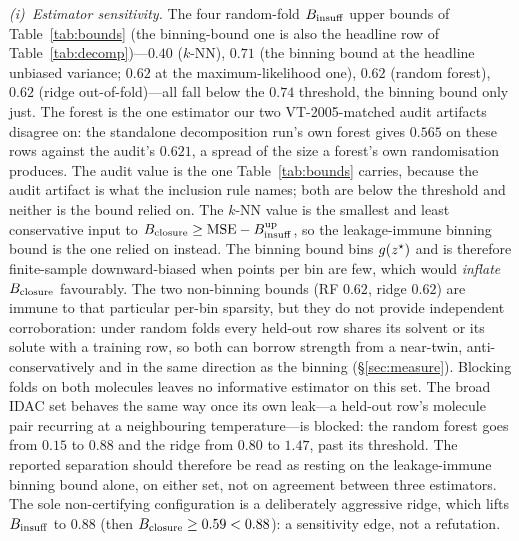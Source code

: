 \emph{(i)~Estimator sensitivity.} The four random-fold $B_{\mathrm{insuff}}$ upper bounds of
Table~\ref{tab:bounds} (the binning-bound one is also the headline row of Table~\ref{tab:decomp})---$0.40$
($k$-NN), $0.71$ (the binning bound at the headline unbiased variance; $0.62$ at the maximum-likelihood
one), $0.62$ (random forest), $0.62$ (ridge out-of-fold)---all fall below the
$0.74$ threshold, the binning bound only just. The forest is the one estimator our two VT-2005-matched audit
artifacts disagree on: the standalone decomposition run's own forest gives $0.565$ on these rows
against the audit's $0.621$, a spread of the size a forest's own randomisation produces. The audit
value is the one Table~\ref{tab:bounds} carries, because the audit artifact
is what the inclusion rule names; both are below the threshold and neither is the bound relied on.
The $k$-NN value is the smallest and least conservative input to $B_{\mathrm{closure}}\ge\mathrm{MSE}-B_{\mathrm{insuff}}^{\mathrm{up}}$,
so the leakage-immune binning bound is the one relied on instead. The binning bound bins $g(z^\star)$ and is therefore
finite-sample downward-biased when points per bin are few, which would \emph{inflate} $B_{\mathrm{closure}}$ favourably.
The two non-binning bounds (RF $0.62$, ridge $0.62$) are immune to that particular per-bin sparsity,
but they do not provide independent corroboration: under random folds every held-out row shares its
solvent or its solute with a training row, so both can borrow strength from a near-twin,
anti-conservatively and in the same direction as the binning (\S\ref{sec:measure}). Blocking folds on
both molecules leaves no informative estimator on this set. The broad IDAC set behaves the same
way once its own leak---a held-out row's molecule pair recurring at a neighbouring temperature---is
blocked: the random forest goes from $0.15$ to $0.88$ and the ridge from $0.80$ to $1.47$, past its
threshold. The reported separation should therefore be read as resting on the leakage-immune binning bound alone,
on either set, not on agreement between three estimators.
The sole non-certifying configuration is a
deliberately aggressive ridge, which lifts $B_{\mathrm{insuff}}$ to $0.88$ (then $B_{\mathrm{closure}}\ge0.59<0.88$): a sensitivity
edge, not a refutation.

